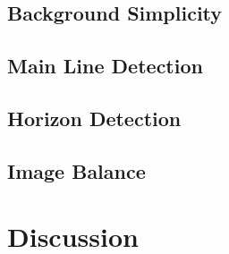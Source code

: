\subsection{Background Simplicity}
\label{sub:background}


\subsection{Main Line Detection}
\label{sub:line_detection}

\subsection{Horizon Detection}
\label{sub:horizon_detection}

\subsection{Image Balance}
\label{sub:balance}

\section{Discussion}
\label{sec:system_discussion}